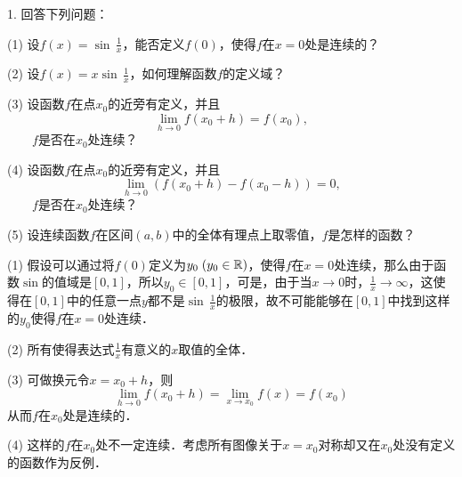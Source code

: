 \exercise

1. 回答下列问题：

\begin{minipage}[l]{0.8\textwidth}
    \setlength{\leftskip}{0.5em}

    \medskip
    (1) 设$f(x)=\sin \, \displaystyle\frac{1}{x}$，能否定义$f(0)$，使得$f$在$x=0$处是连续的？
    \medskip

    (2) 设$f(x)=x \sin \, \displaystyle\frac{1}{x}$，如何理解函数$f$的定义域？
    \medskip

    (3) 设函数$f$在点$x_0$的近旁有定义，并且
    \begin{equation*}
        \lim_{h \to 0} f(x_0 + h) = f(x_0),
    \end{equation*}
    ~~~~$f$是否在$x_0$处连续？
    \medskip

    (4) 设函数$f$在点$x_0$的近旁有定义，并且
    \begin{equation*}
        \lim_{h \to 0} \left(f(x_0+h)-f(x_0-h)\right)=0,
    \end{equation*}
    ~~~~$f$是否在$x_0$处连续？
    \medskip

    (5) 设连续函数$f$在区间$(a,b)$中的全体有理点上取零值，$f$是怎样的函数？
\end{minipage}
\bigskip

(1) \answer 假设可以通过将$f(0)$定义为$y_0 \;(y_0 \in \mathbb{R})$，使得$f$在$x=0$处连续，那么由于函数$\sin$的值域是$[0,1]$，所以$y_0 \in [0,1]$，可是，由于当$x \to 0$时，$\displaystyle\frac{1}{x} \to \infty$，这使得在$[0,1]$中的任意一点$y$都不是$\sin \, \displaystyle\frac{1}{x}$的极限，故不可能能够在$[0,1]$中找到这样的$y_0$使得$f$在$x=0$处连续．
\bigskip

(2) \answer 所有使得表达式$\displaystyle\frac{1}{x}$有意义的$x$取值的全体．
\bigskip

(3) \answer 可做换元令$x = x_0 + h$，则
\begin{equation*}
    \lim_{h \to 0} f(x_0 + h) = \lim_{x \to x_0} f(x) = f(x_0)
\end{equation*}
从而$f$在$x_0$处是连续的．

(4) \answer 这样的$f$在$x_0$处不一定连续．考虑所有图像关于$x = x_0$对称却又在$x_0$处没有定义的函数作为反例．
\bigskip

